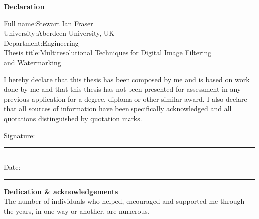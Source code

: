 \documentclass[12pt]{report}
\begin{document}
\setlength{\topskip}{3.3cm}
\noindent \huge {\bf Declaration} \normalsize \vspace{1.44cm}
\begin{tabbing}
Full name:\hspace{0.6cm}\=Stewart Ian Fraser \\
University:\>Aberdeen University, UK \\
Department:\>Engineering \\
Thesis title:\>Multiresolutional Techniques for Digital Image Filtering \\
\>and Watermarking \\
\end{tabbing}
I hereby declare that this thesis has been composed by me
and is based on work done by me and that this thesis
has not been presented for assessment in any previous
application for a degree, diploma or other similar award.
I also declare that all sources of information have been
specifically acknowledged and all quotations distinguished
by quotation marks.
\vspace{3cm}

\noindent Signature: \rule[-0.05cm]{5cm}{0.01cm} \rule{0.5cm}{0cm} Date: \rule[-0.05cm]{5cm}{0.01cm}
\newpage



\setlength{\topskip}{3.3cm}
\noindent \huge {\bf Dedication \& acknowledgements} \normalsize \vspace{1.8cm} \\
The number of individuals who helped, encouraged and supported me 
through the years, in one way or another, are numerous.
\end{document}
